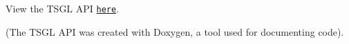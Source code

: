 View the T\-S\-G\-L A\-P\-I \href{http://calvin-cs.github.io/TSGL/html/annotated.html}{\tt here}.

(The T\-S\-G\-L A\-P\-I was created with Doxygen, a tool used for documenting code). 
